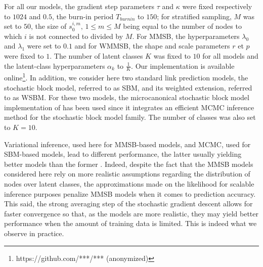 For all our models, the gradient step parameters  $\tau$ and $\kappa$ were fixed respectively to  $1024$ and $0.5$, the burn-in period $T_{burnin}$ to $150$; for stratified sampling, $M$ was set to $50$, the size of $s_0^{i,m}, \, 1 \le m \le M$ being equal to the number of nodes to which $i$ is not connected to divided by $M$. For MMSB, the hyperparameters $\lambda_0$ and $\lambda_1$ were set to $0.1$ and for WMMSB, the shape and scale parameters $r$ et $p$ were fixed to $1$. The number of latent classes $K$ was fixed to $10$ for all models and the latent-class hyperparameters $\alpha_k$ to $\frac{1}{K}$. Our implementation is available online\footnote{https://github.com/***/*** (anonymized)}. In addition, we consider here two standard link prediction models, the stochastic block model, referred to as SBM, and its weighted extension, referred to as WSBM. For these two models, the microcanonical stochastic block model implementation of \cite{peixoto2018nonparametric} has been used since it integrates an efficient MCMC inference method for the stochastic block model family.  The number of classes was also set to $K=10$.

Variational inference, used here for MMSB-based models, and MCMC, used for SBM-based models, lead to different performance, the latter usually yielding better models than the former \cite{}. Indeed, despite the fact that the MMSB models considered here rely on more realistic assumptions regarding the distribution of nodes over latent classes, the approximations made on the likelihood for scalable inference purposes penalize MMSB models when it comes to prediction accuracy. This said, the strong averaging step of the stochastic gradient descent allows for faster convergence so that, as the models are more realistic, they may yield better performance when the amount of training data is limited. This is indeed what we observe in practice.


